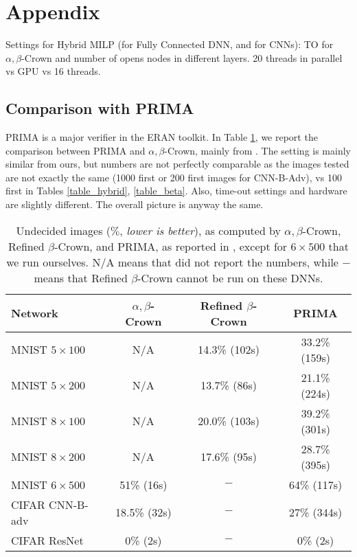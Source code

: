 \section*{Appendix}

Settings for Hybrid MILP (for Fully Connected DNN, and for CNNs): TO for $\alpha,\beta$-Crown
and number of opens nodes in different layers. 20 threads in parallel vs GPU vs 16 threads.

\subsection*{Comparison with PRIMA}

PRIMA \cite{prima} is a major verifier in the ERAN toolkit. In Table \ref{table9}, we report the comparison between PRIMA and $\alpha,\beta$-Crown, mainly from \cite{crown}. The setting is mainly similar from ours, but numbers are not perfectly comparable as the images tested are not  exactly the same (1000 first or 200 first images for CNN-B-Adv), vs 100 first in Tables \ref{table_hybrid}, \ref{table_beta}. Also, time-out settings and hardware are slightly different. The overall picture is anyway the same.

\begin{table}[h!]
	\centering
	\begin{tabular}{||l||c|c||c||}
		\hline \hline
		Network & $\alpha,\beta$-Crown & Refined $\beta$-Crown & PRIMA \\ 		  
		\hline
		MNIST $5 \times 100$ & N/A  & 14.3\% (102s) & 33.2\% (159s)\\ \hline
		MNIST $5 \times 200$ & N/A & 13.7\% (86s) & 21.1\% (224s) \\ \hline
		MNIST $8 \times 100$ & N/A  & 20.0\% (103s) & 39.2\% (301s)   \\ \hline
		MNIST $8 \times 200$ & N/A & 17.6\% (95s) & 28.7\% (395s)  \\ \hline
		MNIST $6 \times 500$ & 51\% (16s) & $-$ & 64\% (117s) \\ \hline
		CIFAR CNN-B-adv & 18.5\% (32s) & $-$ & 27\% (344s)\\ \hline \hline
		CIFAR ResNet & 0\% (2s) & $-$ & 0\% (2s) \\ \hline \hline
	\end{tabular}
	\caption{Undecided images ($\%$, {\em lower is better}), as computed by $\alpha,\beta$-Crown, Refined $\beta$-Crown, and PRIMA, as reported in \cite{crown}, except for $6 \times 500$ that we run ourselves. N/A means that \cite{crown} did not report the numbers, while $-$ means that Refined $\beta$-Crown cannot be run on these DNNs.}
	\label{table9}
	\end{table}

